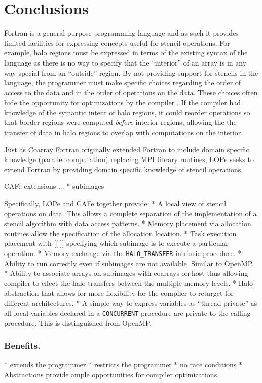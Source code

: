 \section{Conclusions}

Fortran is a general-purpose programming language and as such it provides limited facilities for
expressing concepts useful for stencil operations. For example, halo regions must be expressed in
terms of the existing syntax of the language as there is no way to specify that the ``interior'' of
an array is in any way special from an ``outside'' region.  By not providing support for stencils in
the language, the programmer must make specific choices regarding the order of access to the data
and in the order of operations on the data.  These choices often hide the opportunity for
optimizations by the compiler \cite{dubey:2014:wosc}.  If the compiler had knowledge of the symantic
intent of halo regions, it could reorder operations so that border regions were computed
\emph{before} interior regions, allowing the the transfer of data in halo regions to overlap with
computations on the interior.

Just as Coarray Fortran originally extended Fortran to include domain specific knowledge (parallel
computation) replacing MPI library routines\cite{numeric:reid}, LOPe seeks to extend Fortran by
providing domain specific knowledge of stencil operations.  

CAFe extensions ...
* subimages

Specifically, LOPe and CAFe together provide:
* A local view of stencil operations on data.  This allows a complete separation of the implementation of a stencil algorithm with data access patterns.
* Memory placement via allocation routines allow the specification of the allocation location.
* Task execution placement with [[ ]] specifying which subimage is to execute a particular operation.
* Memory exchange via the \texttt{HALO\_TRANSFER} intrinsic procedure.
* Ability to run correctly even if subimages are not available.  Similar to OpenMP.
* Ability to associate arrays on subimages with coarrays on host thus allowing compiler to effect the halo transfers between the multiple memory levels.
* Halo abstraction that allows for more flexibility for the compiler to retarget for different architectures.
* A simple way to express variables as ``thread private'' as all local variables declared in a \texttt{CONCURRENT} procedure are private to the calling procedure.  This is distinguished from OpenMP.

\subsubsection{Benefits.}
* extends the programmer
* restricts the programmer
* no race conditions
* Abstractions provide ample opportunities for compiler optimizations.


